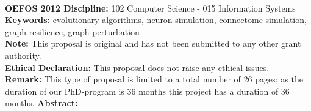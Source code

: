 \documentclass[a4paper,11pt]{article}
\begin{document}
\\[0,3cm]
%
%
{\bf OEFOS 2012 Discipline:} 102 Computer Science - 015  Information Systems 
\\[0,2cm]
{\bf Keywords:} evolutionary algorithms, neuron simulation, connectome simulation, graph resilience, graph perturbation %
\\[0,2cm]
{\bf Note:} This proposal is original and has not been submitted to any other grant authority.
\\[0,2cm]
{\bf Ethical Declaration:} This proposal does not raise any ethical issues.
\\[0,2cm]
{\bf Remark:} This type of proposal is limited to a total number of 26 pages; as the duration of our PhD-program is 36 months this project has a duration of 36 months.
\newpage
%
%
{\bf Abstract:}
\\[0,2cm]
\end{document}
